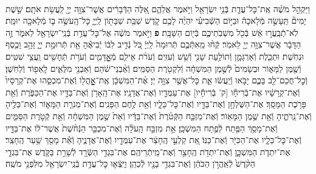 \documentclass[twoside, openany, parskip=half, 11pt]{book}
\begin{document}
\begin{footnotesize}
\begin{multicols}{2}
\\
וַיַּקְהֵ֣ל מֹשֶׁ֗ה אֶֽת־כׇּל־עֲדַ֛ת בְּֿנֵ֥י יִשְׂרָאֵ֖ל וַיֹּ֣אמֶר אֲלֵהֶ֑ם אֵ֚לֶּה הַדְּֿבָרִ֔ים אֲשֶׁר־צִוָּ֥ה יְיָ֖ לַֽעֲשׂ֥ת אֹתָֽם׃ שֵׁ֣שֶׁת יָמִים֘ תֵּֽעָשֶׂ֣ה מְֿלָאכָה֒ וּבַיּ֣וֹם הַשְּֿׁבִיעִ֗י יִהְיֶ֨ה לָכֶ֥ם קֹ֛דֶשׁ שַׁבַּ֥ת שַׁבָּת֖וֹן לַֽיְיָ֑ כׇּל־הָֽעֹשֶׂ֥ה ב֛וֹ מְֿלָאכָ֖ה יוּמָֽת׃ לֹֽא־תְֿבַֽעֲר֣וּ אֵ֔שׁ בְּֿכֹ֖ל מֽשְׁבֹֽתֵיכֶ֑ם בְּֿי֖וֹם הַשַּׁבָּֽת׃ \textbf{פ}
וַיֹּ֣אמֶר מֹשֶׁ֔ה אֶל־כׇּל־עֲדַ֥ת בְּֿנֵֽי־יִשְׂרָאֵ֖ל לֵאמֹ֑ר זֶ֣ה הַדָּבָ֔ר אֲשֶׁר־צִוָּ֥ה יְיָ֖ לֵאמֹֽר׃ קְֿח֨וּ מֵֽאִתְּֿכֶ֤ם תְּֿרוּמָה֙ לַֽיְיָ֔ כֹּ֚ל נְֿדִ֣יב לִבּ֔וֹ יְֿבִיאֶ֕הָ אֵ֖ת תְּֿרוּמַ֣ת יְיָ֑ זָהָ֥ב וָכֶ֖סֶף וּנְחֹֽשֶׁת׃ וּתְכֵ֧לֶת וְֿאַרְגָּמָ֛ן וְֿתוֹלַ֥עַת שָׁנִ֖י וְֿשֵׁ֥שׁ וְֿעִזִּֽים׃ וְֿעֹרֹ֨ת אֵילִ֧ם מְֿאׇׇׇׇׇׇָדָּמִ֛ים וְֿעֹרֹ֥ת תְּֿחָשִׁ֖ים וַֽעֲצֵ֥י שִׁטִּֽים׃ וְֿשֶׁ֖מֶן לַמָּא֑וֹר וּבְשָׂמִים֙ לְֿשֶׁ֣מֶן הַמִּשְׁחָ֔ה וְֿלִקְטֹ֖רֶת הַסַּמִּֽים׃ וְֿאַ֨בְנֵי־שֹׁ֔הַם וְֿאַבְנֵ֖י מִלֻּאִ֑ים לָֽאֵפ֖וֹד וְֿלַחֹֽשֶׁן׃ וְֿכׇל־חֲכַם־לֵ֖ב בָּכֶ֑ם יָבֹ֣אוּ וְֿיַֽעֲשׂ֔וּ אֵ֛ת כׇּל־אֲשֶׁ֥ר צִוָּ֖ה יְיָ׃
אֶ֨ת־הַמִּשְׁכָּ֔ן אֶֽת־אׇׇׇׇׇָֽהֳל֖וֹ וְֿאֶת־מִכְסֵ֑הוּ אֶת־קְרָסָיו֙ וְֿאֶת־קְרָשָׁ֔יו אֶת־בְּֿרִיחָ֕ו [ק' בְּֿרִיחָ֕יו] אֶת־עַמֻּדָ֖יו וְֿאֶת־אֲדָנָֽיו׃ אֶת־הָֽאָרֹ֥ן וְֿאֶת־בַּדָּ֖יו אֶת־הַכַּפֹּ֑רֶת וְֿאֵ֖ת פָּרֹ֥כֶת הַמָּסָֽךְ׃ אֶת־הַשֻּׁלְחָ֥ן וְֿאֶת־בַּדָּ֖יו וְֿאֶת־כׇּל־כֵּלָ֑יו וְֿאֵ֖ת לֶ֥חֶם הַפָּנִֽים׃ וְֿאֶת־מְנֹרַ֧ת הַמָּא֛וֹר וְֿאֶת־כֵּלֶ֖יהָ וְֿאֶת־נֵֽרֹתֶ֑יהָ וְֿאֵ֖ת שֶׁ֥מֶן הַמָּאֽוֹר׃ וְֿאֶת־מִזְבַּ֤ח הַקְּֿטֹ֨רֶת֙ וְֿאֶת־בַּדָּ֔יו וְֿאֵת֙ שֶׁ֣מֶן הַמִּשְׁחָ֔ה וְֿאֵ֖ת קְֿטֹ֣רֶת הַסַּמִּ֑ים וְֿאֶת־מָסַ֥ךְ הַפֶּ֖תַח לְֿפֶ֥תַח הַמִּשְׁכָּֽן׃ אֵ֣ת מִזְבַּ֣ח הָֽעֹלָ֗ה וְֿאֶת־מִכְבַּ֤ר הַנְּֿחֹ֨שֶׁת֙ אֲשֶׁר־ל֔וֹ אֶת־בַּדָּ֖יו וְֿאֶת־כׇּל־כֵּלָ֑יו אֶת־הַכִּיֹּ֖ר וְֿאֶת־כַּנּֽוֹ׃ אֵ֚ת קַלְעֵ֣י הֶֽחָצֵ֔ר אֶת־עַמֻּדָ֖יו וְֿאֶת־אֲדָנֶ֑יהָ וְֿאֵ֕ת מָסַ֖ךְ שַׁ֥עַר הֶֽחָצֵֽר׃ אֶת־יִתְדֹ֧ת הַמִּשְׁכָּ֛ן וְֿאֶת־יִתְדֹ֥ת הֶֽחָצֵ֖ר וְֿאֶת־מֵֽיתְֿרֵיהֶֽם׃ אֶת־בִּגְדֵ֥י הַשְּֿׂרָ֖ד לְֿשָׁרֵ֣ת בַּקֹּ֑דֶשׁ אֶת־בִּגְדֵ֤י הַקֹּ֨דֶשׁ֙ לְֿאַֽהֲרֹ֣ן הַכֹּהֵ֔ן וְֿאֶת־בִּגְדֵ֥י בָנָ֖יו לְֿכַהֵֽן׃ וַיֵּֽצְֿא֛וּ כׇּל־עֲדַ֥ת בְּֿנֵֽי־יִשְׂרָאֵ֖ל מִלִּפְנֵ֥י מֹשֶֽׁה׃


\end{multicols}
\end{footnotesize}
\end{document}
